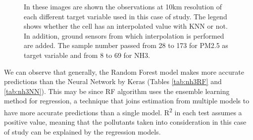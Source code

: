 \begin{figure}[H] 
    \centering
    \hfill%
    \caption{In these images are shown the observations at 10km resolution of each different target variable used in this case of study. The legend shows whether the cell has an interpolated value with KNN or not. In addition, ground sensors from which interpolation is performed are added. 
    The sample number passed from 28 to 173 for PM2.5 as target variable and from 8 to 69 for NH3.}
    \label{fig:comparison-sensors}
\end{figure}

We can observe that generally, the Random Forest model makes more accurate predictions than the Neural Network by Keras (Tables \ref{tab:nh3RF} and \ref{tab:nh3NN}). 
This may be since RF algorithm uses the ensemble learning method for regression, a technique that joins estimation from multiple models to have more accurate predictions than a single model. 
R\textsuperscript{2} in each test assumes a positive value, meaning that the pollutants taken into consideration in this case of study can be explained by the regression models. 
